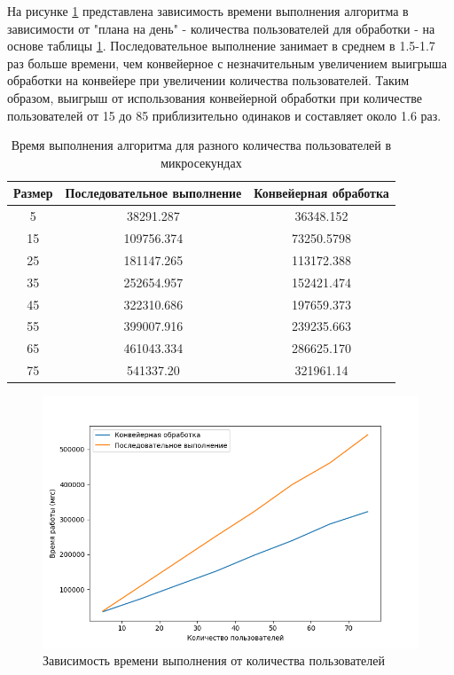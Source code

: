 \documentclass[12pt]{report}
\begin{document}
    На рисунке \ref{fig:graph} представлена зависимость времени выполнения алгоритма в зависимости от "плана на день" - количества пользователей для обработки - на основе таблицы \ref{tab:time}. Последовательное выполнение занимает в среднем в 1.5-1.7 раз больше времени, чем конвейерное с незначительным увеличением выигрыша обработки на конвейере при увеличении количества пользователей. Таким образом, выигрыш от использования конвейерной обработки при количестве пользователей от 15 до 85 приблизительно одинаков и составляет около 1.6 раз.
    \begin{table}[H]
    	\begin{center}
    		\captionsetup{justification=raggedleft, singlelinecheck=false}
    		\caption{\label{tab:time} Время выполнения алгоритма для разного количества пользователей в микросекундах}
    		\begin{tabular}{|c| c | c|} 
    			\hline
    			Размер&Последовательное выполнение&Конвейерная обработка\\ [0.5ex]
    			\hline
    			5 &   38291.287 &  36348.152\\ 
    			\hline
    			15 &   109756.374 &   73250.5798 \\ 
    			\hline
    			25 &   181147.265 &   113172.388 \\ 
    			\hline
    			35 &   252654.957 &   152421.474 \\ 
    			\hline
    			45 &  322310.686 &  197659.373 \\ 
    			\hline
    			55 & 399007.916 & 239235.663 \\ 
    			\hline
    			65 & 461043.334 & 286625.170 \\ 
    			\hline
    			75 & 541337.20 & 321961.14 \\ 
    			\hline
    		\end{tabular}
    	\end{center}
    \end{table}
    
    \begin{figure}[H]
    	\centering
    	\includegraphics[width=0.9\linewidth]{img/con_vs_serial}
    	\caption{Зависимость времени выполнения от количества пользователей}
    	\label{fig:graph}
    \end{figure}
    
\end{document}
